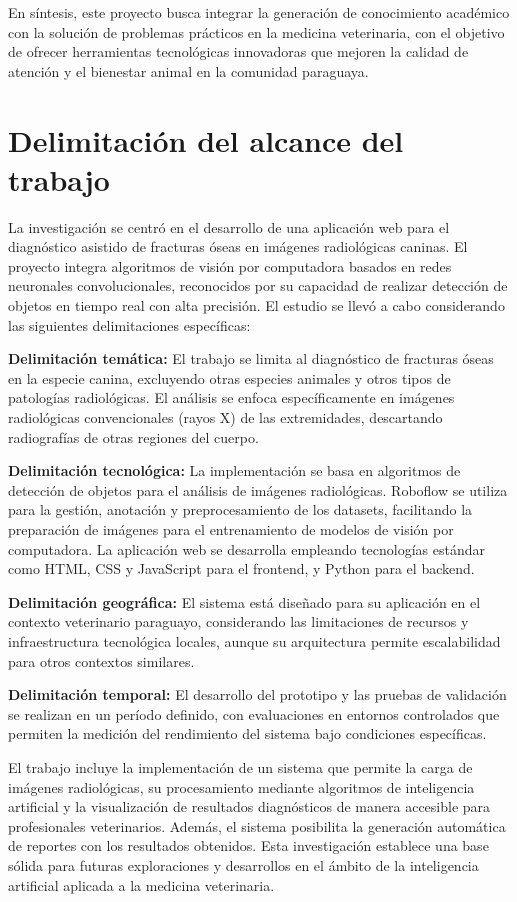 En síntesis, este proyecto busca integrar la generación de conocimiento académico con la solución de problemas prácticos en la medicina veterinaria, con el objetivo de ofrecer herramientas tecnológicas innovadoras que mejoren la calidad de atención y el bienestar animal en la comunidad paraguaya.

\section{Delimitación del alcance del trabajo}
La investigación se centró en el desarrollo de una aplicación web para el diagnóstico asistido de fracturas óseas en imágenes radiológicas caninas. El proyecto integra algoritmos de visión por computadora basados en redes neuronales convolucionales, reconocidos por su capacidad de realizar detección de objetos en tiempo real con alta precisión. El estudio se llevó a cabo considerando las siguientes delimitaciones específicas:

\textbf{Delimitación temática:} El trabajo se limita al diagnóstico de fracturas óseas en la especie canina, excluyendo otras especies animales y otros tipos de patologías radiológicas. El análisis se enfoca específicamente en imágenes radiológicas convencionales (rayos X) de las extremidades, descartando radiografías de otras regiones del cuerpo.

\textbf{Delimitación tecnológica:} La implementación se basa en algoritmos de detección de objetos para el análisis de imágenes radiológicas. Roboflow se utiliza para la gestión, anotación y preprocesamiento de los datasets, facilitando la preparación de imágenes para el entrenamiento de modelos de visión por computadora. La aplicación web se desarrolla empleando tecnologías estándar como HTML, CSS y JavaScript para el frontend, y Python para el backend.

\textbf{Delimitación geográfica:} El sistema está diseñado para su aplicación en el contexto veterinario paraguayo, considerando las limitaciones de recursos y infraestructura tecnológica locales, aunque su arquitectura permite escalabilidad para otros contextos similares.

\textbf{Delimitación temporal:} El desarrollo del prototipo y las pruebas de validación se realizan en un período definido, con evaluaciones en entornos controlados que permiten la medición del rendimiento del sistema bajo condiciones específicas.

El trabajo incluye la implementación de un sistema que permite la carga de imágenes radiológicas, su procesamiento mediante algoritmos de inteligencia artificial y la visualización de resultados diagnósticos de manera accesible para profesionales veterinarios. Además, el sistema posibilita la generación automática de reportes con los resultados obtenidos. Esta investigación establece una base sólida para futuras exploraciones y desarrollos en el ámbito de la inteligencia artificial aplicada a la medicina veterinaria.